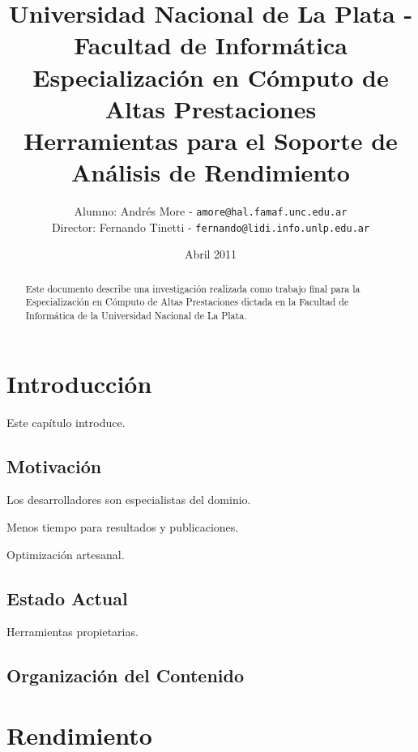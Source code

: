\documentclass[a4paper]{report}
\begin{document}
\title{Universidad Nacional de La Plata - Facultad de Inform\'atica\\
Especializaci\'on en C\'omputo de Altas Prestaciones\\
\bigskip
Herramientas para el Soporte de An\'alisis de Rendimiento}

\author{Alumno: Andr\'es More - {\tt amore@hal.famaf.unc.edu.ar}\\
Director: Fernando Tinetti - {\tt fernando@lidi.info.unlp.edu.ar}}

\date{Abril 2011}
\maketitle

\begin{abstract}
  Este documento describe una investigaci\'on realizada como trabajo final para
  la Especializaci\'on en C\'omputo de Altas Prestaciones dictada en la Facultad
  de Inform\'atica de la Universidad Nacional de La Plata.
\end{abstract}

\tableofcontents

\chapter{Introducci\'on}

Este cap\'itulo introduce.

\section{Motivaci\'on}

Los desarrolladores son especialistas del dominio.

Menos tiempo para resultados y publicaciones.

Optimizaci\'on artesanal.

\section{Estado Actual}

Herramientas propietarias.

\section{Organizaci\'on del Contenido}

\chapter{Rendimiento}
\end{document}
